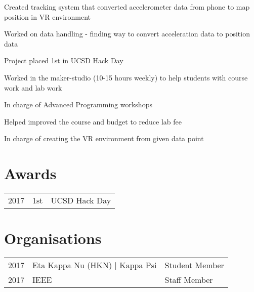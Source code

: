 \documentclass[]{deedy-resume-openfont}
\begin{document}
\begin{minipage}[t]{0.66\textwidth}
\begin{tightemize}
\item Created tracking system that converted accelerometer data from phone to map position in VR environment
\item Worked on data handling - finding way to convert acceleration data to position data
\item Project placed 1st in UCSD Hack Day
\end{tightemize}
\sectionsep

\begin{tightemize}
\item Worked in the maker-studio (10-15 hours weekly) to help students with course work and lab work
\item In charge of Advanced Programming workshops
\item Helped improved the course and budget to reduce lab fee
\end{tightemize}
\sectionsep

\begin{tightemize}
\item In charge of creating the VR environment from given data point
\end{tightemize}
\sectionsep


\section{Awards} 
\begin{tabular}{rll}
2017	     & 1st  & UCSD Hack Day\\
\end{tabular}
\sectionsep


\section{Organisations}
\begin{tabular}{rll}
2017    & Eta Kappa Nu (HKN) | Kappa Psi &Student Member\\
2017   & IEEE  & Staff Member\\
\end{tabular}
\sectionsep

\end{minipage} 
\end{document}
